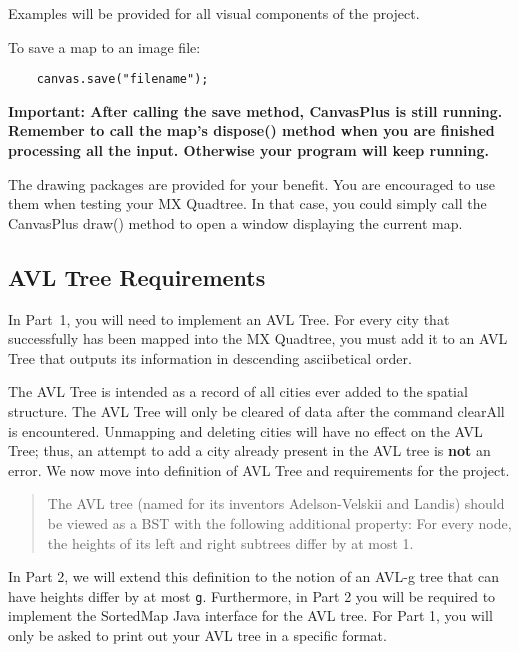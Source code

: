 \documentclass[12pt]{article}
\begin{document}
Examples will be provided for all visual components of the project.

To save a map to an image file:
\begin{verbatim}
	canvas.save("filename");
\end{verbatim}
{\bf Important: After calling the save method, CanvasPlus is still running. 
Remember to call the map's dispose() method when you are finished processing all the input. 
Otherwise your program will keep running.}

The drawing packages are provided for your benefit. You are encouraged to use them when testing your MX Quadtree. In that case, you could simply call the CanvasPlus draw() method to open a window displaying the current map.

\subsection{AVL Tree Requirements}
 
In Part~1, you will need to implement an AVL Tree. For every city that
successfully has been mapped into the MX Quadtree, you must add it to
an  AVL Tree that outputs its information in descending  asciibetical order. 

The AVL Tree is intended as a record of all cities ever added to the spatial structure.
The AVL Tree will only be cleared of data after the command clearAll is encountered. Unmapping and deleting cities will have no effect on the AVL Tree; thus, an attempt to add a city already present in the  AVL tree  is \textbf{not} an error.
We now move into definition of AVL Tree and requirements for the project.

\begin{quote}
The AVL tree (named for its inventors Adelson-Velskii and Landis) should be
viewed as a BST with the following additional property: For every node, the heights
of its left and right subtrees differ by at most 1.
\end{quote}

In Part 2, we will extend this definition to the notion of an AVL-g tree that can have heights differ by at most \texttt{g}. Furthermore, in Part 2 you will be required to implement the SortedMap Java interface for the AVL tree. For Part 1, you will only be asked to print out your AVL tree in a specific format.


\end{document}
